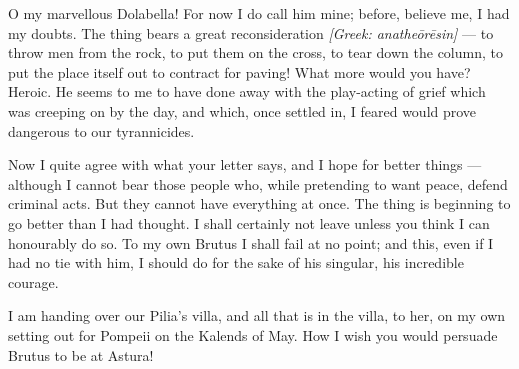 

 O my marvellous Dolabella! For now I do call him mine; before, believe me, I had my doubts. The thing bears a great reconsideration \textit{[Greek: anathe\=or\=esin]} --- to throw men from the rock, to put them on the cross, to tear down the column, to put the place itself out to contract for paving! What more would you have? Heroic. He seems to me to have done away with the play-acting of grief which was creeping on by the day, and which, once settled in, I feared would prove dangerous to our tyrannicides.

 Now I quite agree with what your letter says, and I hope for better things --- although I cannot bear those people who, while pretending to want peace, defend criminal acts. But they cannot have everything at once. The thing is beginning to go better than I had thought. I shall certainly not leave unless you think I can honourably do so. To my own Brutus I shall fail at no point; and this, even if I had no tie with him, I should do for the sake of his singular, his incredible courage.

 I am handing over our Pilia's villa, and all that is in the villa, to her, on my own setting out for Pompeii on the Kalends of May. How I wish you would persuade Brutus to be at Astura!

